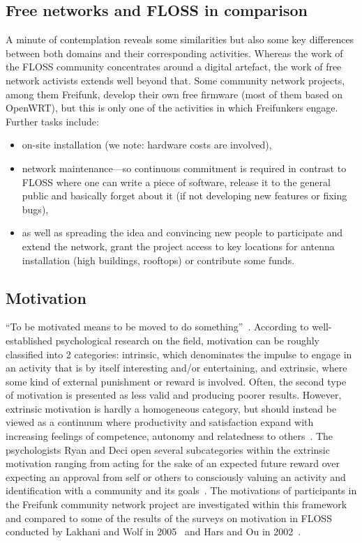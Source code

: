 \subsection{Free networks and FLOSS in comparison}\label{subsec:comparison}
A minute of contemplation reveals some similarities but also some key differences between both domains and their corresponding activities. %
Whereas the work of the FLOSS community concentrates around a digital artefact, the work of free network activists extends well beyond that.
Some community network projects, among them Freifunk, develop their own free firmware (most of them based on OpenWRT), but this is only one of the activities in which Freifunkers engage.
Further tasks include:
\begin{itemize}
  \item on-site installation (we note: hardware costs are involved),
  \item network maintenance---so continuous commitment is required in contrast to FLOSS where one can write a piece of software, release it to the general public and basically forget about it (if not developing new features or fixing bugs),
  \item as well as spreading the idea and convincing new people to participate and extend the network, grant the project access to key locations for antenna installation (high buildings, rooftops) or contribute some funds. %
\end{itemize}

\subsection{Motivation}\label{subsec:motivation}
``To be motivated means to be moved to do something''~\cite{RyDe2000}.
According to well-established psychological research on the field, motivation can be roughly classified into 2 categories:
intrinsic, which denominates the impulse to engage in an activity that is by itself interesting and/or entertaining,
and extrinsic, where some kind of external punishment or reward is involved.
Often, the second type of motivation is presented as less valid and producing poorer results. %
However, extrinsic motivation is hardly a homogeneous category, but should instead be viewed as a continuum where productivity and satisfaction expand with increasing feelings of competence, autonomy and relatedness to others~\cite{RyDe2000}.
The psychologists Ryan and Deci open several subcategories within the extrinsic motivation ranging from acting for the sake of an expected future reward over expecting an approval from self or others to consciously valuing an activity and identification with a community and its goals~\cite{RyDe2000}.
The motivations of participants in the Freifunk community network project are investigated within this framework and compared to some of the results of the surveys on motivation in FLOSS conducted by Lakhani and Wolf in 2005~\cite{LakWo2005} and Hars and Ou in 2002~\cite{HarOu2002}.

